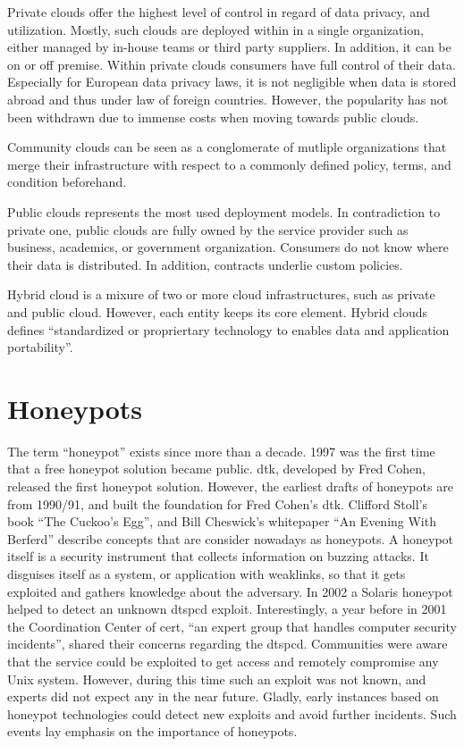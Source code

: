 Private clouds offer the highest level of control in regard of data privacy, and utilization. Mostly, such clouds are deployed within in a single organization, either managed by in-house teams or third party suppliers.
In addition, it can be on or off premise.
Within private clouds consumers have full control of their data.
Especially for European data privacy laws, it is not negligible when data is stored abroad and thus under law of foreign countries.
However, the popularity has not been withdrawn due to immense costs when moving towards public clouds. \cite{Dillon2010, Mell2011}

Community clouds can be seen as a conglomerate of mutliple organizations that merge their infrastructure with respect to a commonly defined policy, terms, and condition beforehand. \cite{Mell2011}

Public clouds represents the most used deployment models.
In contradiction to private one, public clouds are fully owned by the service provider such as business, academics, or government organization.
Consumers do not know where their data is distributed.
In addition, contracts underlie custom policies. \cite{Mell2011}

Hybrid cloud is a mixure of two or more cloud infrastructures, such as private and public cloud.
However, each entity keeps its core element.
Hybrid clouds defines \enquote{standardized or propriertary technology to enables data and application portability}\cite{Mell2011}.

\section{Honeypots}

The term \enquote{honeypot} exists since more than a decade.
1997 was the first time that a free honeypot solution became public.
\ac{dtk}, developed by Fred Cohen, released the first honeypot solution.
However, the earliest drafts of honeypots are from 1990/91, and built the foundation for Fred Cohen's \ac*{dtk}.
Clifford Stoll's book \enquote{The Cuckoo's Egg}\cite{stroll2000}, and Bill Cheswick's whitepaper \enquote{An Evening With Berferd}\cite{Cheswick92} describe concepts that are consider nowadays as honeypots.\cite{Spitzner2003}
A honeypot itself is a security instrument that collects information on buzzing attacks.
It disguises itself as a system, or application with weaklinks, so that it gets exploited and gathers knowledge about the adversary.
In 2002 a Solaris honeypot helped to detect an unknown dtspcd exploit.
Interestingly, a year before in 2001 the Coordination Center of \ac{cert}, \enquote{an expert group that handles computer security incidents}\cite{cert2021}, shared their concerns regarding the dtspcd.
Communities were aware that the service could be exploited to get access and remotely compromise any Unix system.
However, during this time such an exploit was not known, and experts did not expect any in the near future.
Gladly, early instances based on honeypot technologies could detect new exploits and avoid further incidents.
Such events lay emphasis on the importance of honeypots.

